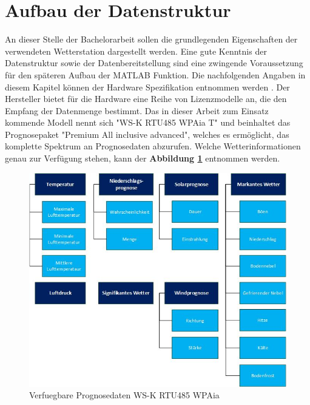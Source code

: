 \section{Aufbau der Datenstruktur}
An dieser Stelle der Bachelorarbeit sollen die grundlegenden Eigenschaften der verwendeten Wetterstation dargestellt werden. Eine gute Kenntnis der Datenstruktur sowie der Datenbereitstellung sind eine zwingende Voraussetzung für den späteren Aufbau der MATLAB Funktion. Die nachfolgenden Angaben in diesem Kapitel können der Hardware Spezifikation entnommen werden \cite{HKWDoc}. Der Hersteller bietet für die Hardware eine Reihe von Lizenzmodelle an, die den Empfang der Datenmenge bestimmt. Das in dieser Arbeit zum Einsatz kommende Modell nennt sich "{}WS-K RTU485 WPAia T"{} und beinhaltet das Prognosepaket "Premium All inclusive advanced", welches es ermöglicht, das komplette Spektrum an Prognosedaten abzurufen. Welche Wetterinformationen genau zur Verfügung stehen, kann der \textbf{Abbildung \ref{fig:datenstrukt}} entnommen werden.
\begin{figure}[h]
\centering
\includegraphics[scale=0.65]{weatherstation/Datenuebersicht}
\caption{Verfuegbare Prognosedaten WS-K RTU485 WPAia}
\label{fig:datenstrukt}
\end{figure}
